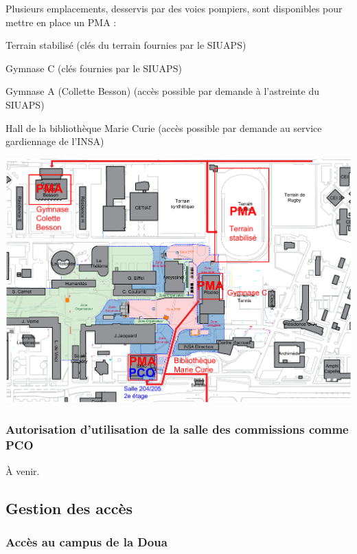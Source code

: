 \documentclass[hidelinks, paper=a4, fontsize=13pt]{report}
\begin{document}
Plusieurs emplacements, desservis par des voies pompiers, sont disponibles pour mettre en place un PMA :
\begin{list}{•}{}
	\item Terrain stabilisé (clés du terrain fournies par le SIUAPS)
	\item Gymnase C (clés fournies par le SIUAPS)
	\item Gymnase A (Collette Besson) (accès possible par demande à l’astreinte du SIUAPS)
	\item Hall de la bibliothèque Marie Curie (accès possible par demande au service gardiennage de l’INSA)
\end{list}
\begin{center}
	\includegraphics[width=.8\textwidth,keepaspectratio]{Exports/Plan_24h_44eme-PCO_PMA}
	\label{refEmplacementPMA}
\end{center}

\newpage


\subsubsection{Autorisation d’utilisation de la salle des commissions comme PCO}
À venir.
\begin{center}
\end{center}


\subsection{Gestion des accès}
\subsubsection{Accès au campus de la Doua}
\end{document}

